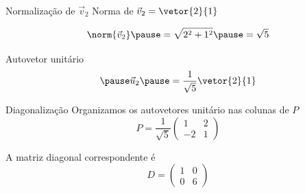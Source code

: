 \begin{resolution}{Normalização de $\vec{v}_2$}
  Norma de
  \(
    \vec{v}_2 = \vetor{2}{1}
  \)

  \pause
  \[
    \norm{\vec{v}_{2}}
    \pause
    = \sqrt{2^{2}+1^{2}}
    \pause
    = \sqrt{5}
  \]

  \pause
  Autovetor unitário
  \[
    \pause
    \vec{u}_{2}
    \pause
    = \frac{1}{\sqrt{5}}
      \vetor{2}{1}
  \]
\end{resolution}

\begin{resolution}{Diagonalização}
  Organizamos os autovetores unitário nas colunas de $P$
  \[
    P =
    \frac{1}{\sqrt{5}}
    \begin{pmatrix}
      1  & 2 \\
      -2 & 1
    \end{pmatrix}
  \]

  \pause
  A matriz diagonal correspondente é
  \[
    D =
    \begin{pmatrix}
        1 & 0\\
        0 & 6
    \end{pmatrix}
  \]
\end{resolution}

